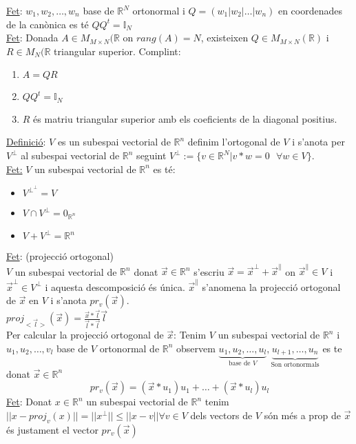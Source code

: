 \underline{Fet}: $w_1, w_2, \dots, w_n$ base de $\mathbb{R}^N$ ortonormal i $Q = (w_1|w_2|\dots|w_n)$ en coordenades de la canònica es té $QQ^t = \mathbb{I}_N$\\
\underline{Fet}: Donada $A \in M_{M\times N}(\mathbb{R}$ on $rang(A) = N$, existeixen $Q \in M_{M\times N}(\mathbb{R})$ i $R \in M_N(\mathbb{R}$ triangular superior. Complint:
\begin{enumerate}
    \item $A = QR$
    \item $QQ^t = \mathbb{I}_N$
    \item $R$ és matriu triangular superior amb els coeficients de la diagonal positius.
\end{enumerate}
\underline{Definició}: $V$ es un subespai vectorial de $\mathbb{R}^n$ definim l'ortogonal de $V$ i s'anota per $V^\perp$ al subespai vectorial de $\mathbb{R}^n$ seguint $V^\perp := \{v \in \mathbb{R}^N | v*w = 0 \text{ } \forall w \in V \}$.\\
\underline{Fet:} $V$ un subespai vectorial de $\mathbb{R}^n$ es té:
\begin{itemize}
    \item $V^{\perp^\perp} = V$
    \item $V \cap V^\perp = 0_{\mathbb{R}^n}$
    \item $V + V^\perp = \mathbb{R}^n$
\end{itemize}
\underline{Fet}: (projecció ortogonal)\\
$V$ un subespai vectorial de $\mathbb{R}^n$ donat $\vec{x} \in \mathbb{R}^n$ s'escriu $\Vec{x} = \Vec{x}^\perp + \Vec{x}^\parallel$ on $\vec{x}^\parallel \in V$ i $\Vec{x}^\perp \in V^\perp$ i aquesta descomposició és única. $\vec{x}^\parallel$ s'anomena la projecció ortogonal de $\Vec{x}$ en $V$ i s'anota $pr_v(\Vec{x})$.\\
$proj_{<\vec{l}>}(\vec{x})=\frac{\Vec{x}*\vec{l}}{\Vec{l}*\vec{l}}\Vec{l}$\\
Per calcular la projecció ortogonal de $\vec{x}$: Tenim $V$ un subespai vectorial de $\mathbb{R}^n$ i $u_1, u_2, \dots, v_l$ base de $V$ ortonormal de $\mathbb{R}^n$ observem $\underbrace{u_1, u_2, \dots, u_l}_{\text{base de } V},\underbrace{u_{l+1}, \dots, u_n}_\text{Son ortonormals}$ es te donat $\vec{x} \in \mathbb{R}^n$
\begin{displaymath}
    pr_v(\vec{x}) = (\vec{x}*u_1)u_1+\dots+(\vec{x}*u_l)u_l
\end{displaymath}
\underline{Fet}: Donat $x \in \mathbb{R}^n$ un subespai vectorial de $\mathbb{R}^n$ tenim $||x-proj_v(x)|| = ||x^\perp||\leq ||x-v|| \forall v \in V$ dels vectors de $V$ són més a prop de $\Vec{x}$ és justament el vector $pr_v(\Vec{x})$\\
